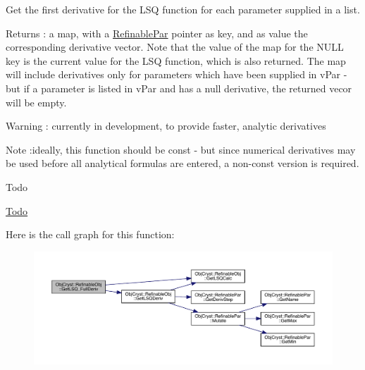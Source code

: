 Get the first derivative for the L\+SQ function for each parameter supplied in a list.

\begin{DoxyReturn}{Returns}
\+: a map, with a \mbox{\hyperlink{class_obj_cryst_1_1_refinable_par}{Refinable\+Par}} pointer as key, and as value the corresponding derivative vector. Note that the value of the map for the N\+U\+LL key is the current value for the L\+SQ function, which is also returned. The map will include derivatives only for parameters which have been supplied in v\+Par -\/ but if a parameter is listed in v\+Par and has a null derivative, the returned vecor will be empty.
\end{DoxyReturn}
\begin{DoxyWarning}{Warning}
\+: currently in development, to provide faster, analytic derivatives
\end{DoxyWarning}
\begin{DoxyNote}{Note}
\+:ideally, this function should be const -\/ but since numerical derivatives may be used before all analytical formulas are entered, a non-\/const version is required. 
\end{DoxyNote}
\begin{DoxyRefDesc}{Todo}
\item[\mbox{\hyperlink{todo__todo000006}{Todo}}]\end{DoxyRefDesc}
Here is the call graph for this function\+:
\nopagebreak
\begin{figure}[H]
\begin{center}
\leavevmode
\includegraphics[width=350pt]{class_obj_cryst_1_1_refinable_obj_a83c6f2679b8dadd780e77b1f71d4cd02_cgraph}
\end{center}
\end{figure}
\mbox{\label{class_obj_cryst_1_1_refinable_obj_a1946baf8a64267d50ffe6a79b96f4add}} 
